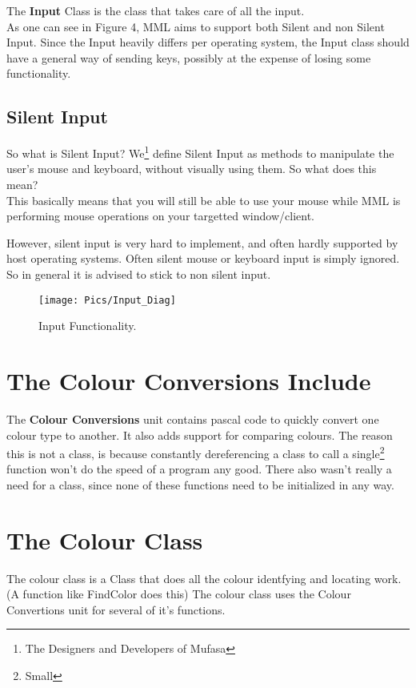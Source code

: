 \documentclass[a4paper, 10pt]{report} %
\begin{document}
The \textbf{Input} Class is the class that takes care of all the input. \\
As one can see in Figure 4, MML aims to support both Silent and non Silent 
Input. Since the Input heavily differs per operating system, 
the Input class should have a general way of sending keys,
possibly at the expense of losing some functionality.

\subsection{Silent Input}

So what is Silent Input?
We\footnote{The Designers and Developers of Mufasa} define Silent Input as
methods to manipulate the user's mouse and keyboard, without visually using
them. So what does this mean? \\

This basically means that you will still be able to use your mouse while
MML is performing mouse operations on your targetted window/client.

However, silent input is very hard to implement, and often hardly supported
by host operating systems. Often silent mouse or keyboard input is simply 
ignored. So in general it is advised to stick to non silent input.


\begin{figure}[ht]
	\texttt{[image: Pics/Input\_Diag]}
	\caption{Input Functionality.}
\end{figure}

\section{The Colour Conversions Include}

The \textbf{Colour Conversions} unit contains pascal code to quickly convert
one colour type to another. It also adds support for comparing colours.
The reason this is not a class, is because constantly dereferencing a class
to call a single\footnote{Small} function won't do the speed of a program any 
good. There also wasn't really a need for a class,
since none of these functions need to be initialized in any way.

\section{The Colour Class}

The colour class is a Class that does all the colour identfying and locating
work. (A function like FindColor does this)
The colour class uses the Colour Convertions unit for several of it's
functions.
\end{document}
